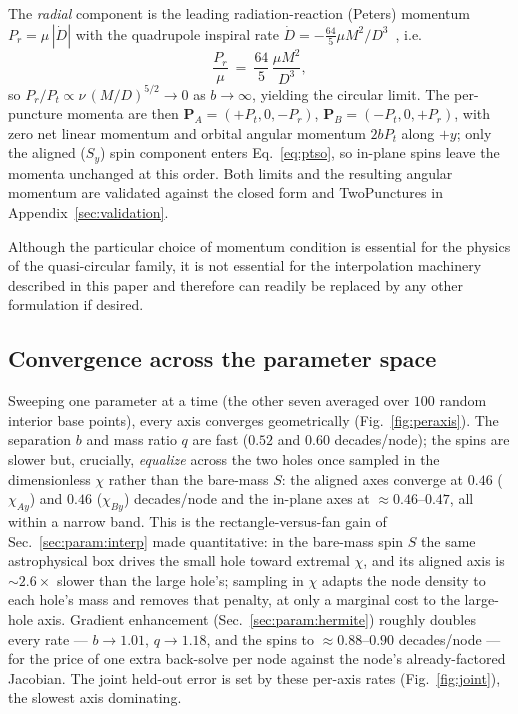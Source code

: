 \documentclass[
  aps,
  prd,
  twocolumn,
  amsmath,
  amssymb,
  nofootinbib,
  superscriptaddress,
  floatfix,
]{revtex4-2}
\begin{document}
The \emph{radial} component is the leading radiation-reaction (Peters) momentum
$P_r=\mu\,|\dot D|$ with the quadrupole inspiral rate
$\dot D=-\tfrac{64}{5}\mu M^2/D^3$~\cite{Peters1964,Walther2009}, i.e.
\begin{equation}
  \frac{P_r}{\mu} \ = \ \frac{64}{5}\,\frac{\mu M^2}{D^3},
  \label{eq:pr}
\end{equation}
so $P_r/P_t\propto\nu\,(M/D)^{5/2}\!\to0$ as $b\to\infty$, yielding the circular limit.
The per-puncture momenta are then $\mathbf{P}_A=(+P_t,0,-P_r)$,
$\mathbf{P}_B=(-P_t,0,+P_r)$, with zero net linear momentum and orbital angular
momentum $2bP_t$ along $+y$; only the aligned ($S_y$) spin component enters
Eq.~\eqref{eq:ptso}, so in-plane spins leave the momenta unchanged at this order. Both
limits and the resulting angular momentum are validated against the closed form
and TwoPunctures in Appendix~\ref{sec:validation}.

Although the particular choice of momentum condition is essential for the physics of the quasi-circular family,
it is not essential for the interpolation machinery described in this paper and therefore can readily be replaced by any other formulation if desired.


\subsection{Convergence across the parameter space}
\label{sec:model:peraxis}
Sweeping one parameter at a time (the other seven averaged over $100$ random
interior base points), every axis converges geometrically (Fig.~\ref{fig:peraxis}). The
separation $b$ and mass ratio $q$ are fast ($0.52$
and $0.60$ decades/node); the spins are slower but, crucially, \emph{equalize}
across the two holes once sampled in the dimensionless $\chi$ rather than the
bare-mass $S$: the aligned axes converge at $0.46$ ($\chi_{Ay}$) and $0.46$
($\chi_{By}$) decades/node and the in-plane axes at $\approx0.46$--$0.47$, all
within a narrow band. This is the rectangle-versus-fan gain of
Sec.~\ref{sec:param:interp} made quantitative: in the bare-mass spin $S$ the same
astrophysical box drives the small hole toward extremal $\chi$, and its aligned
axis is $\sim\!2.6\times$ slower than the large hole's; sampling in $\chi$ adapts
the node density to each hole's mass and removes that penalty, at only a marginal
cost to the large-hole axis. Gradient enhancement
(Sec.~\ref{sec:param:hermite}) roughly doubles every rate --- $b\to1.01$,
$q\to1.18$, and the spins to $\approx0.88$--$0.90$ decades/node --- for the price
of one extra back-solve per node against the node's already-factored Jacobian. The
joint held-out error is set by these per-axis rates
(Fig.~\ref{fig:joint}), the slowest axis dominating.
\end{document}
